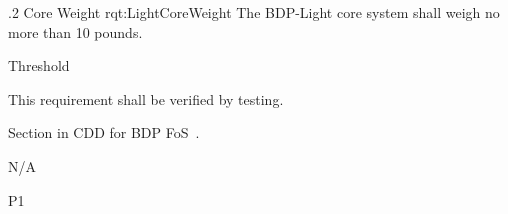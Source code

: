 \ONERQMTVKSA
{\RqtNumberBase.2}
{Core Weight}
{rqt:LightCoreWeight}
{The BDP-Light core system shall weigh no more than 10 pounds.}
{
	\item [Phase 1] Threshold
}
{This requirement shall be verified by testing.}
{
\item [5.5.6.2] Section in CDD for BDP FoS~\cite{ref__BDP_FOS_CDD}.
}
{
	\item N/A
}
{P1}
